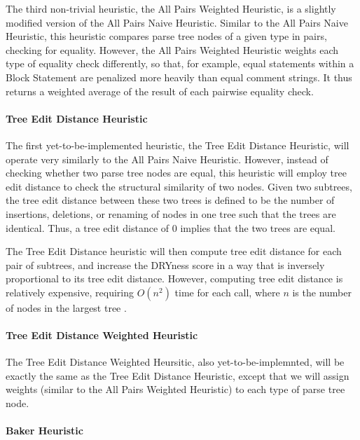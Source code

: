 \documentclass{article}
\begin{document}
The third non-trivial heuristic, the All Pairs Weighted Heuristic, is a slightly modified version of the All Pairs Naive Heuristic.
Similar to the All Pairs Naive Heuristic, this heuristic compares parse tree nodes of a given type in pairs, checking for equality.
However, the All Pairs Weighted Heuristic weights each type of equality check differently, so that, for example, equal statements
within a Block Statement are penalized more heavily than equal comment strings. It thus returns a weighted average of the result
of each pairwise equality check.

\paragraph{Tree Edit Distance Heuristic}

The first yet-to-be-implemented heuristic, the Tree Edit Distance Heuristic, will operate very similarly to the All Pairs
Naive Heuristic. However, instead of checking whether two parse tree nodes are equal, this heuristic will employ tree edit
distance to check the structural similarity of two nodes. Given two subtrees, the tree edit distance between these two
trees is defined to be the number of insertions, deletions, or renaming of nodes in one tree such that the trees are
identical\cite{TreeEditDistance}. Thus, a tree edit distance of 0 implies that the two trees are equal.

The Tree Edit Distance heuristic will then compute tree edit distance for each pair of subtrees, and increase the DRYness score
in a way that is inversely proportional to its tree edit distance. However, computing tree edit distance is relatively expensive,
requiring $O(n^2)$ time for each call, where $n$ is the number of nodes in the largest tree \cite{TreeEditDistance}.

\paragraph{Tree Edit Distance Weighted Heuristic}

The Tree Edit Distance Weighted Heursitic, also yet-to-be-implemnted, will be exactly the same as the Tree Edit Distance Heuristic,
except that we will assign weights (similar to the All Pairs Weighted Heuristic) to each type of parse tree node.

\paragraph{Baker Heuristic}
\end{document}
